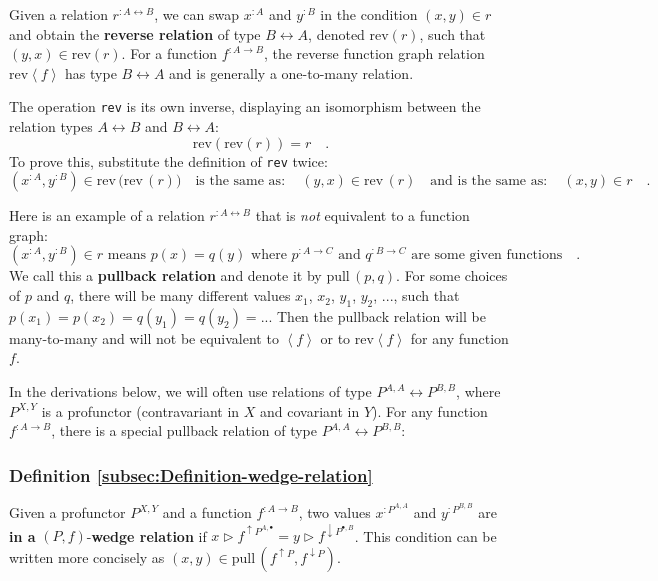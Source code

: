 Given a relation $r^{:A\leftrightarrow B}$, we can swap $x^{:A}$
and $y^{:B}$ in the condition $(x,y)\in r$ and obtain the \textbf{reverse
relation} of type $B\leftrightarrow A$, denoted $\text{rev}\left(r\right)$,
such that $(y,x)\in\text{rev}\left(r\right)$. For a function $f^{:A\rightarrow B}$,
the reverse function graph relation $\text{rev}\left<f\right>$ has
type $B\leftrightarrow A$ and is generally a one-to-many relation. 

The operation \lstinline!rev! is its own inverse, displaying an isomorphism
between the relation types $A\leftrightarrow B$ and $B\leftrightarrow A$:
\[
\text{rev}\left(\text{rev}\left(r\right)\right)=r\quad.
\]
To prove this, substitute the definition of \lstinline!rev! twice:
\[
(x^{:A},y^{:B})\in\text{rev}\,\big(\text{rev}\,(r)\big)\quad\text{is the same as}:\quad(y,x)\in\text{rev}\,(r)\quad\text{and is the same as}:\quad(x,y)\in r\quad.
\]

Here is an example of a relation $r^{:A\leftrightarrow B}$ that is
\emph{not} equivalent to a function graph:
\[
(x^{:A},y^{:B})\in r\text{ means }p(x)=q(y)\text{ where }p^{:A\rightarrow C}\text{ and }q^{:B\rightarrow C}\text{ are some given functions}\quad.
\]
We call this a \textbf{pullback relation}
and denote it by $\text{pull}\,(p,q)$. For some choices of $p$ and
$q$, there will be many different values $x_{1}$, $x_{2}$, $y_{1}$,
$y_{2}$, ..., such that $p(x_{1})=p(x_{2})=q(y_{1})=q(y_{2})=...$
Then the pullback relation will be many-to-many and will not be equivalent
to $\left<f\right>$ or to $\text{rev}\left<f\right>$ for any function
$f$. 

In the derivations below, we will often use relations of type $P^{A,A}\leftrightarrow P^{B,B}$,
where $P^{X,Y}$ is a profunctor (contravariant in $X$ and covariant
in $Y$). For any function $f^{:A\rightarrow B}$, there is a special
pullback relation of type $P^{A,A}\leftrightarrow P^{B,B}$: 

\subsubsection{Definition \label{subsec:Definition-wedge-relation}\ref{subsec:Definition-wedge-relation}}

Given a profunctor
$P^{X,Y}$ and a function $f^{:A\rightarrow B}$, two values $x^{:P^{A,A}}$
and $y^{:P^{B,B}}$ are \textbf{in a} $\left(P,f\right)$-\textbf{wedge
relation} if $x\triangleright f^{\uparrow P^{A,\bullet}}=y\triangleright f^{\downarrow P^{\bullet,B}}$.
This condition can be written more concisely as $(x,y)\in\text{pull}\,(f^{\uparrow P},f^{\downarrow P})$.

